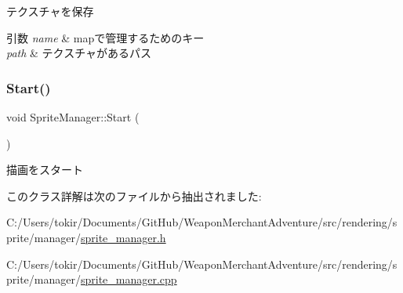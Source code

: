 テクスチャを保存 


\begin{DoxyParams}{引数}
{\em name} & mapで管理するためのキー \\
\hline
{\em path} & テクスチャがあるパス \\
\hline
\end{DoxyParams}
\mbox{\label{class_sprite_manager_a6b387e8736713264f6d590082cd492cb}} 
\subsubsection{\texorpdfstring{Start()}{Start()}}
{\footnotesize\ttfamily void Sprite\+Manager\+::\+Start (\begin{DoxyParamCaption}{ }\end{DoxyParamCaption})\hspace{0.3cm}{\ttfamily [inline]}}



描画をスタート 



このクラス詳解は次のファイルから抽出されました\+:\begin{DoxyCompactItemize}
\item 
C\+:/\+Users/tokir/\+Documents/\+Git\+Hub/\+Weapon\+Merchant\+Adventure/src/rendering/sprite/manager/\mbox{\hyperlink{sprite__manager_8h}{sprite\+\_\+manager.\+h}}\item 
C\+:/\+Users/tokir/\+Documents/\+Git\+Hub/\+Weapon\+Merchant\+Adventure/src/rendering/sprite/manager/\mbox{\hyperlink{sprite__manager_8cpp}{sprite\+\_\+manager.\+cpp}}\end{DoxyCompactItemize}
